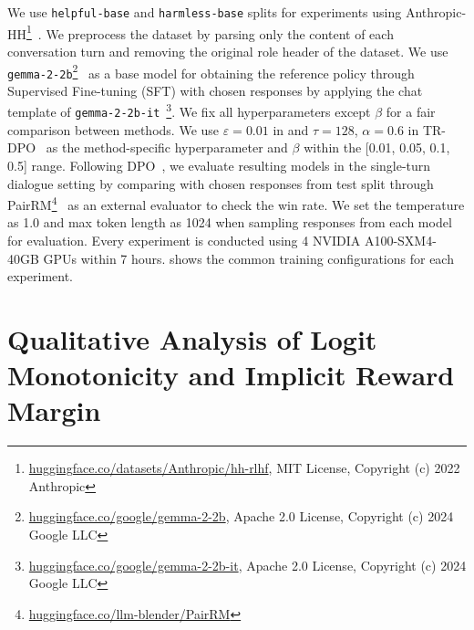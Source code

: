 We use \texttt{helpful-base} and \texttt{harmless-base} splits for experiments using Anthropic-HH\footnote{\href{https://huggingface.co/datasets/Anthropic/hh-rlhf}{huggingface.co/datasets/Anthropic/hh-rlhf}, MIT License, Copyright (c) 2022 Anthropic}~\cite{bai2022training}. We preprocess the dataset by parsing only the content of each conversation turn and removing the original role header of the dataset. We use \texttt{gemma-2-2b}\footnote{\href{https://huggingface.co/google/gemma-2-2b}{huggingface.co/google/gemma-2-2b}, Apache 2.0 License, Copyright (c) 2024 Google LLC}~\cite{team2024gemma} as a base model for obtaining the reference policy through Supervised Fine-tuning (SFT) with chosen responses by applying the chat template of \texttt{gemma-2-2b-it}~\cite{team2024gemma}\footnote{\href{https://huggingface.co/google/gemma-2-2b-it}{huggingface.co/google/gemma-2-2b-it}, Apache 2.0 License, Copyright (c) 2024 Google LLC}. We fix all hyperparameters except $\beta$ for a fair comparison between methods. We use $\varepsilon=0.01$ in \method{} and $\tau=128$, $\alpha=0.6$ in TR-DPO~\cite{gorbatovski2024learn} as the method-specific hyperparameter and $\beta$ within the [0.01, 0.05, 0.1, 0.5] range. Following DPO~\cite{rafailov2023direct}, we evaluate resulting models in the single-turn dialogue setting by comparing with chosen responses from test split through PairRM\footnote{\href{https://huggingface.co/llm-blender/PairRM}{huggingface.co/llm-blender/PairRM}}~\cite{jiang2023llm} as an external evaluator to check the win rate. We set the temperature as 1.0 and max token length as 1024 when sampling responses from each model for evaluation. Every experiment is conducted using 4 NVIDIA A100-SXM4-40GB GPUs within 7 hours.  shows the common training configurations for each experiment.



\section{Qualitative Analysis of Logit Monotonicity and Implicit Reward Margin}
\label{app:qualitative_analysis}

